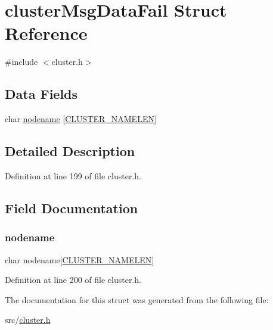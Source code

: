 \hypertarget{structcluster_msg_data_fail}{}\section{cluster\+Msg\+Data\+Fail Struct Reference}
\label{structcluster_msg_data_fail}


{\ttfamily \#include $<$cluster.\+h$>$}

\subsection*{Data Fields}
\begin{DoxyCompactItemize}
\item 
char \hyperlink{structcluster_msg_data_fail_a50eb514a773ea3e78ec45e62fc0d7b9f}{nodename} \mbox{[}\hyperlink{cluster_8h_ace7a882972eff7149675252938643b6e}{C\+L\+U\+S\+T\+E\+R\+\_\+\+N\+A\+M\+E\+L\+EN}\mbox{]}
\end{DoxyCompactItemize}


\subsection{Detailed Description}


Definition at line 199 of file cluster.\+h.



\subsection{Field Documentation}
\mbox{\label{structcluster_msg_data_fail_a50eb514a773ea3e78ec45e62fc0d7b9f}} 
\subsubsection{\texorpdfstring{nodename}{nodename}}
{\footnotesize\ttfamily char nodename\mbox{[}\hyperlink{cluster_8h_ace7a882972eff7149675252938643b6e}{C\+L\+U\+S\+T\+E\+R\+\_\+\+N\+A\+M\+E\+L\+EN}\mbox{]}}



Definition at line 200 of file cluster.\+h.



The documentation for this struct was generated from the following file\+:\begin{DoxyCompactItemize}
\item 
src/\hyperlink{cluster_8h}{cluster.\+h}\end{DoxyCompactItemize}

